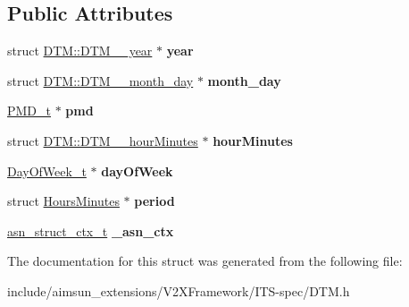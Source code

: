 \subsection*{Public Attributes}
\begin{DoxyCompactItemize}
\item 
struct \hyperlink{structDTM_1_1DTM____year}{D\+T\+M\+::\+D\+T\+M\+\_\+\+\_\+year} $\ast$ {\bfseries year}\hypertarget{structDTM_ab0d505820c5fee382c06e582ea787d47}{}\label{structDTM_ab0d505820c5fee382c06e582ea787d47}

\item 
struct \hyperlink{structDTM_1_1DTM____month__day}{D\+T\+M\+::\+D\+T\+M\+\_\+\+\_\+month\+\_\+day} $\ast$ {\bfseries month\+\_\+day}\hypertarget{structDTM_a7547610d4fdee9fe08146b87b040cb93}{}\label{structDTM_a7547610d4fdee9fe08146b87b040cb93}

\item 
\hyperlink{structBIT__STRING__s}{P\+M\+D\+\_\+t} $\ast$ {\bfseries pmd}\hypertarget{structDTM_ac7396f90ef027a5576405d220b1294b0}{}\label{structDTM_ac7396f90ef027a5576405d220b1294b0}

\item 
struct \hyperlink{structDTM_1_1DTM____hourMinutes}{D\+T\+M\+::\+D\+T\+M\+\_\+\+\_\+hour\+Minutes} $\ast$ {\bfseries hour\+Minutes}\hypertarget{structDTM_a28a810ae669e9e4b0a85abed3572ede1}{}\label{structDTM_a28a810ae669e9e4b0a85abed3572ede1}

\item 
\hyperlink{structBIT__STRING__s}{Day\+Of\+Week\+\_\+t} $\ast$ {\bfseries day\+Of\+Week}\hypertarget{structDTM_ab4b5b9f23d65379a0faa8d731b6abdfe}{}\label{structDTM_ab4b5b9f23d65379a0faa8d731b6abdfe}

\item 
struct \hyperlink{structHoursMinutes}{Hours\+Minutes} $\ast$ {\bfseries period}\hypertarget{structDTM_ac917966e8a45ce68e44bb7840ccb6498}{}\label{structDTM_ac917966e8a45ce68e44bb7840ccb6498}

\item 
\hyperlink{structasn__struct__ctx__s}{asn\+\_\+struct\+\_\+ctx\+\_\+t} {\bfseries \+\_\+asn\+\_\+ctx}\hypertarget{structDTM_a9bd97d8597f2de52d94e454262c27c15}{}\label{structDTM_a9bd97d8597f2de52d94e454262c27c15}

\end{DoxyCompactItemize}


The documentation for this struct was generated from the following file\+:\begin{DoxyCompactItemize}
\item 
include/aimsun\+\_\+extensions/\+V2\+X\+Framework/\+I\+T\+S-\/spec/D\+T\+M.\+h\end{DoxyCompactItemize}
